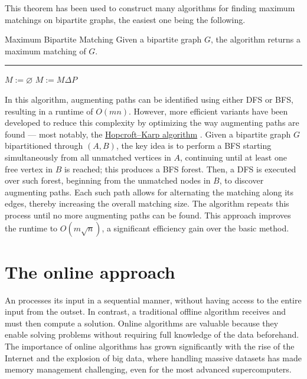 \documentclass[a4paper, 12pt]{report}
\begin{document}
    This theorem has been used to construct many algorithms for finding maximum matchings on bipartite graphs, the easiest one being the following.

    \begin{framedalgo}{Maximum Bipartite Matching}
        Given a bipartite graph $G$, the algorithm returns a maximum matching of $G$. \\
        \hrule

        \quad
        \begin{algorithmic}[1]
                \State $M := \varnothing$
                    \State $M := M \Delta P$
                \EndWhile
            \EndFunction
        \end{algorithmic}
    \end{framedalgo}

    In this algorithm, augmenting paths can be identified using either DFS or BFS, resulting in a runtime of $O(mn)$. However, more efficient variants have been developed to reduce this complexity by optimizing the way augmenting paths are found --- most notably, the \href{https://en.wikipedia.org/wiki/Hopcroft%E2%80%93Karp_algorithm}{Hopcroft–Karp algorithm} \cite{hopcroft}. Given a bipartite graph $G$ bipartitioned through $(A, B)$, the key idea is to perform a BFS starting simultaneously from all unmatched vertices in $A$, continuing until at least one free vertex in $B$ is reached; this produces a BFS forest. Then, a DFS is executed over such forest, beginning from the unmatched nodes in $B$, to discover augmenting paths. Each such path allows for alternating the matching along its edges, thereby increasing the overall matching size. The algorithm repeats this process until no more augmenting paths can be found. This approach improves the runtime to $O(m \sqrt n)$, a significant efficiency gain over the basic method.

    \section{The online approach}

    An  processes its input  in a sequential manner, without having access to the entire input from the outset. In contrast, a traditional offline algorithm receives  and must then compute a solution. Online algorithms are valuable because they enable solving problems without requiring full knowledge of the data beforehand. The importance of online algorithms has grown significantly with the rise of the Internet and the explosion of big data, where handling massive datasets has made memory management challenging, even for the most advanced supercomputers.
\end{document}

